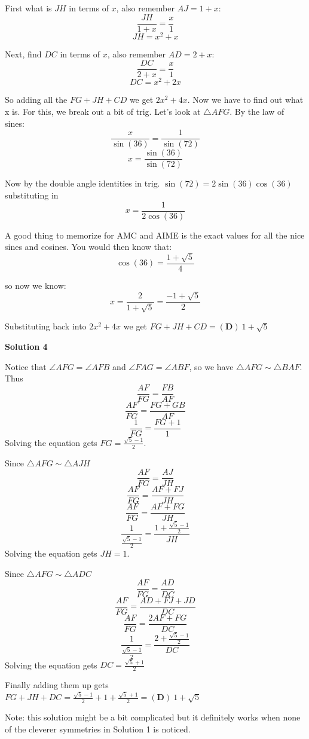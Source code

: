 \begin{enumerate}
 First what is $JH$ in terms of $x$, also remember $AJ = 1+x$: 
 \[\frac{JH}{1+x}=\frac{x}{1}\]
 \[JH = {x}^2+x\]

 Next, find $DC$ in terms of $x$, also remember $AD = 2+x$: 
 \[\frac{DC}{2+x}=\frac{x}{1}\]
 \[DC = {x}^2+2x\]

 So adding all the $FG + JH + CD$ we get $2{x}^2+4x$. Now we have to find out what x is. For this, we break out a bit of trig. Let's look at $\triangle AFG$. By the law of sines:  
 \[\frac{x}{\sin(36)}=\frac{1}{\sin(72)}\]
 \[x=\frac{\sin(36)}{\sin(72)}\]

 Now by the double angle identities in trig. $\sin(72) = 2\sin(36)\cos(36)$ substituting in 
 \[x=\frac{1}{2\cos(36)}\] 

 A good thing to memorize for AMC and AIME is the exact values for all the nice sines and cosines. You would then know that:
 \[\cos(36)= \frac{1 + \sqrt{5}}{4}\] 

 so now we know: 
 \[x = \frac{2}{1+\sqrt{5}} = \frac{-1+\sqrt{5}}{2}\]

 Substituting back into $2{x}^2+4x$ we get $FG+JH+CD=\boxed{\mathbf{(D)}\ 1+\sqrt{5}\ }$




\textbf{Solution 4}

Notice that $\angle AFG=\angle AFB$ and $\angle FAG=\angle ABF$, so we have $\bigtriangleup AFG \sim \bigtriangleup BAF$. Thus
 \[\frac{AF}{FG}=\frac{FB}{AF}\]
 \[\frac{AF}{FG}=\frac{FG+GB}{AF}\]
 \[\frac{1}{FG}=\frac{FG+1}{1}\]Solving the equation gets $FG=\frac{\sqrt{5}-1}{2}$.

 Since $\bigtriangleup AFG \sim \bigtriangleup AJH$
 \[\frac{AF}{FG}=\frac{AJ}{JH}\]
 \[\frac{AF}{FG}=\frac{AF+FJ}{JH}\]
 \[\frac{AF}{FG}=\frac{AF+FG}{JH}\]
 \[\frac{1}{\frac{\sqrt{5}-1}{2}}=\frac{1+\frac{\sqrt{5}-1}{2}}{JH}\]Solving the equation gets $JH=1$.

 Since $\bigtriangleup AFG \sim \bigtriangleup ADC$
 \[\frac{AF}{FG}=\frac{AD}{DC}\]
 \[\frac{AF}{FG}=\frac{AD+FJ+JD}{DC}\]
 \[\frac{AF}{FG}=\frac{2AF+FG}{DC}\]
 \[\frac{1}{\frac{\sqrt{5}-1}{2}}=\frac{2+\frac{\sqrt{5}-1}{2}}{DC}\]Solving the equation gets $DC=\frac{\sqrt{5}+1}{2}$

 Finally adding them up gets $FG+JH+DC=\frac{\sqrt{5}-1}{2}+1+\frac{\sqrt{5}+1}{2}= \boxed{\mathbf{(D)}\ 1+\sqrt{5}\ }$

 Note: this solution might be a bit complicated but it definitely works when none of the cleverer symmetries in Solution 1 is noticed.


\end{enumerate}
